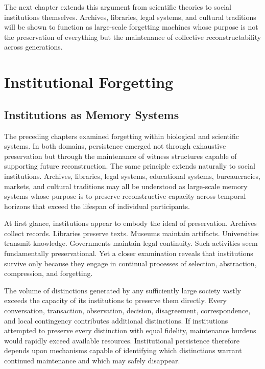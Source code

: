 \documentclass[12pt,oneside]{book}
\theoremstyle{plain} \newtheorem{theorem}{Theorem}[chapter] \newtheorem{lemma}[theorem]{Lemma} \newtheorem{proposition}[theorem]{Proposition} \newtheorem{corollary}[theorem]{Corollary}
\theoremstyle{definition} \newtheorem{definition}[theorem]{Definition} \newtheorem{axiom}[theorem]{Axiom} \newtheorem{construction}[theorem]{Construction}
\theoremstyle{remark} \newtheorem{remark}[theorem]{Remark} \newtheorem{example}[theorem]{Example}
\begin{document}
The next chapter extends this argument from scientific theories to social institutions themselves. Archives, libraries, legal systems, and cultural traditions will be shown to function as large-scale forgetting machines whose purpose is not the preservation of everything but the maintenance of collective reconstructability across generations.

\chapter{Institutional Forgetting}

\section{Institutions as Memory Systems}

The preceding chapters examined forgetting within biological and scientific systems. In both domains, persistence emerged not through exhaustive preservation but through the maintenance of witness structures capable of supporting future reconstruction. The same principle extends naturally to social institutions. Archives, libraries, legal systems, educational systems, bureaucracies, markets, and cultural traditions may all be understood as large-scale memory systems whose purpose is to preserve reconstructive capacity across temporal horizons that exceed the lifespan of individual participants.

At first glance, institutions appear to embody the ideal of preservation. Archives collect records. Libraries preserve texts. Museums maintain artifacts. Universities transmit knowledge. Governments maintain legal continuity. Such activities seem fundamentally preservational. Yet a closer examination reveals that institutions survive only because they engage in continual processes of selection, abstraction, compression, and forgetting.

The volume of distinctions generated by any sufficiently large society vastly exceeds the capacity of its institutions to preserve them directly. Every conversation, transaction, observation, decision, disagreement, correspondence, and local contingency contributes additional distinctions. If institutions attempted to preserve every distinction with equal fidelity, maintenance burdens would rapidly exceed available resources. Institutional persistence therefore depends upon mechanisms capable of identifying which distinctions warrant continued maintenance and which may safely disappear.
\end{document}
